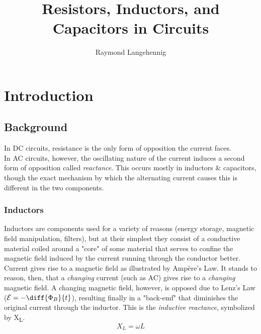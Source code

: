 \documentclass{article}
\title{Resistors, Inductors, and Capacitors in Circuits}
\author{Raymond Langehennig}
\begin{document}
\maketitle

	\section{Introduction}
		\subsection{Background}
			In DC circuits, resistance is the only form of opposition the current faces.\\
			In AC circuits, however, the oscillating nature of the current induces a second form of opposition called \emph{reactance}. This occurs mostly in inductors \& capacitors, though the exact mechanism by which the alternating current causes this is different in the two components.
			
			\subsubsection*{Inductors}
				Inductors are components used for a variety of reasons (energy storage, magnetic field manipulation, filters), but at their simplest they consist of a conductive material coiled around a "core" of some material that serves to confine the magnetic field induced by the current running through the conductor better.\\
				Current gives rise to a magnetic field as illustrated by Amp\`ere's Law. It stands to reason, then, that a \emph{changing} current (such as AC) gives rise to a \emph{changing} magnetic field. A changing magnetic field, however, is opposed due to Lenz's Law ($\mathcal{E} = -\diff{\Phi_B}{t}$), resulting finally in a "back-emf" that diminishes the original current through the inductor. This is the \emph{inductive reactance}, symbolized by X\textsubscript{L}.
				$$ X_L = \omega L $$
\end{document}
